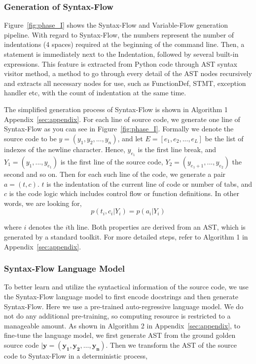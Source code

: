 \documentclass[11pt]{article}
\begin{document}
\subsubsection{Generation of Syntax-Flow}
Figure~\ref{fig:phase_I} shows the Syntax-Flow and Variable-Flow generation pipeline. With regard to Syntax-Flow, the numbers represent the number of indentations (4 spaces) required at the beginning of the command line. Then, a statement is immediately next to the Indentation, followed by several built-in expressions.
This feature is extracted from Python code through AST syntax visitor method, a method to go through every detail of the AST nodes recursively and extracts all necessary nodes for use, such as FunctionDef, STMT, exception handler etc, with the count of indentation at the same time. 



The simplified generation process of Syntax-Flow is shown in Algorithm 1 Appendix~\ref{sec:appendix}. For each line of source code, we generate one line of Syntax-Flow as you can see in Figure~\ref{fig:phase_I}. Formally we denote the source code to be $y = (y_1, y_2,...,y_n)$, and let $E = [e_1,e_2,...,e_L]$ be the list of indexes of the newline character. Hence, $y_{e_1}$ is the first line break, and $Y_1 = (y_1,...,y_{e_1})$ is the first line of the source code, $Y_2 = (y_{e_1+1},...,y_{e_2})$ the second and so on. Then for each such line of the code, we generate a pair $a = (t, c)$. $t$ is the indentation of the current line of code or number of tabs, and $c$ is the code logic which includes control flow or function definitions. In other words, we are looking for, 
\begin{equation}
p(t_i,c_i|Y_i) = p(a_i|Y_i) 
\end{equation}

where $i$ denotes the $i$th line. Both properties are derived from an AST, which is generated by a standard toolkit. For more detailed steps, refer to Algorithm 1 in Appendix~\ref{sec:appendix}.


\subsubsection{Syntax-Flow Language Model}
To better learn and utilize the syntactical information of the source code, we use the Syntax-Flow language model to first encode docstrings and then generate Syntax-Flow. Here we use a pre-trained auto-regressive language model. We do not do any additional pre-training, so computing resource is restricted to a manageable amount. As shown in Algorithm 2 in Appendix~\ref{sec:appendix}, to fine-tune the language model, we first generate AST from the ground golden source code $|\bm{y}=(\bm{y_1},\bm{y_2},\dots,\bm{y_n})$. Then we transform the AST of the source code to Syntax-Flow in a deterministic process,
\end{document}
